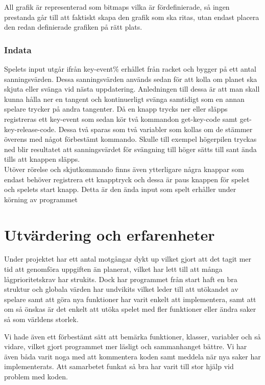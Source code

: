 \documentclass[12pt,a4paper]{article}
\begin{document}
\vspace{0.2cm}

All grafik är representerad som bitmaps vilka är fördefinierade, så ingen prestanda går till att faktiskt skapa den grafik som ska ritas, utan endast placera den redan definierade grafiken på rätt plats.


\subsubsection{Indata} 
Spelets input utgår ifrån key-event\% erhållet från racket och bygger på ett antal sanningsvärden. Dessa sanningsvärden används sedan för att kolla om planet ska skjuta eller svänga vid nästa uppdatering. Anledningen till dessa är att man skall kunna hålla ner en tangent och kontinuerligt svänga samtidigt som en annan spelare trycker på andra tangenter. Då en knapp trycks ner eller släpps registreras ett key-event som sedan kör två kommandon get-key-code samt get-key-release-code. Dessa två sparas som två variabler som kollas om de stämmer överens med något förbestämt kommando. Skulle till exempel högerpilen tryckas ned blir resultatet att sanningsvärdet för svängning till höger sätts till sant ända tills att knappen släpps. \\

Utöver rörelse och skjutkommando finns även ytterligare några knappar som endast behöver registrera ett knapptryck och dessa är paus knappen för spelet och spelets start knapp. Detta är den ända input som spelt erhåller under körning av programmet





\section{Utvärdering och erfarenheter}
    
Under projektet har ett antal motgångar dykt up vilket gjort att det tagit mer tid att genomföra uppgiften än planerat, vilket har lett till att många lågprioritetskrav har strukits. Dock har programmet från start haft en bra struktur och globala värden har undvikits vilket leder till att utökandet av spelare samt att göra nya funktioner har varit enkelt att implementera, samt att om så önskas är det enkelt att utöka spelet med fler funktioner eller ändra saker så som världens storlek.

Vi hade även ett förbestämt sätt att bemärka funktioner, klasser, variabler och så vidare, vilket gjort programmet mer läsligt och sammanhanget bättre.
Vi har även båda varit noga med att kommentera koden samt meddela när nya saker har implementerats.  Att samarbetet funkat så bra har varit till stor hjälp vid problem med koden. \\
\end{document}

